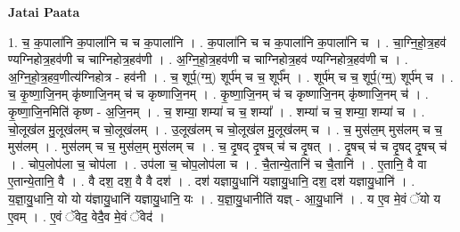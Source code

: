 \documentclass[17pt]{extarticle}
\begin{document}
\textbf{Jatai Paata} \newline

1. च॒ क॒पाला॑नि क॒पाला॑नि च च क॒पाला॑नि । . क॒पाला॑नि च च क॒पाला॑नि क॒पाला॑नि च । . चा॒ग्नि॒हो॒त्र॒हव॑ ण्यग्निहोत्र॒हव॑णी च चाग्निहोत्र॒हव॑णी । . अ॒ग्नि॒हो॒त्र॒हव॑णी च चाग्निहोत्र॒हव॑ ण्यग्निहोत्र॒हव॑णी च । . अ॒ग्नि॒हो॒त्र॒हव॒णीत्य॑ग्निहोत्र - हव॑नी । . च॒ शूर्प॒(ग्म्॒) शूर्प॑म् च च॒ शूर्प᳚म् । . शूर्प॑म् च च॒ शूर्प॒(ग्म्॒) शूर्प॑म् च । . च॒ कृ॒ष्णा॒जि॒नम् कृ॑ष्णाजि॒नम् च॑ च कृष्णाजि॒नम् । . कृ॒ष्णा॒जि॒नम् च॑ च कृष्णाजि॒नम् कृ॑ष्णाजि॒नम् च॑ । . कृ॒ष्णा॒जि॒नमिति॑ कृष्ण - अ॒जि॒नम् । . च॒ शम्या॒ शम्या॑ च च॒ शम्या᳚ । . शम्या॑ च च॒ शम्या॒ शम्या॑ च । . चो॒लूख॑ल मु॒लूख॑लम् च चो॒लूख॑लम् । . उ॒लूख॑लम् च चो॒लूख॑ल मु॒लूख॑लम् च । . च॒ मुस॑ल॒म् मुस॑लम् च च॒ मुस॑लम् । . मुस॑लम् च च॒ मुस॑ल॒म् मुस॑लम् च । . च॒ दृ॒षद् दृ॒षच् च॑ च दृ॒षत् । . दृ॒षच् च॑ च दृ॒षद् दृ॒षच् च॑ । . चोप॒लोप॑ला च॒ चोप॑ला । . उप॑ला च॒ चोप॒लोप॑ला च । . चै॒तान्ये॒तानि॑ च चै॒तानि॑ । . ए॒तानि॒ वै वा ए॒तान्ये॒तानि॒ वै । . वै दश॒ दश॒ वै वै दश॑ । . दश॑ यज्ञायु॒धानि॑ यज्ञायु॒धानि॒ दश॒ दश॑ यज्ञायु॒धानि॑ । . य॒ज्ञा॒यु॒धानि॒ यो यो य॑ज्ञायु॒धानि॑ यज्ञायु॒धानि॒ यः । . य॒ज्ञा॒यु॒धानीति॑ यज्ञ् - आ॒यु॒धानि॑ । . य ए॒व मे॒वं ॅयो य ए॒वम् । . ए॒वं ॅवेद॒ वेदै॒व मे॒वं ॅवेद॑ । \newline
\end{document}
